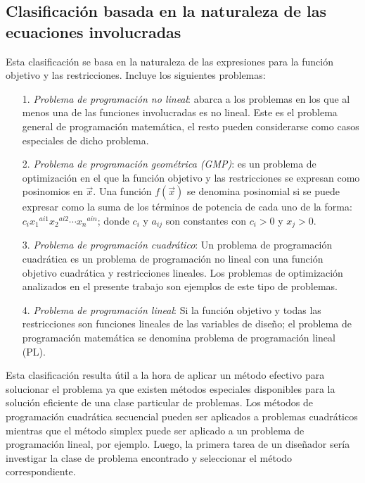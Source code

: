 \subsection{Clasificación basada en la naturaleza de las ecuaciones involucradas} 
Esta clasificación se basa en la naturaleza de las expresiones para la función objetivo y las restricciones.  Incluye los siguientes problemas: 
\begin{itemize}
\item [1.] \textit{Problema de programación no lineal}: abarca a los problemas en los que al menos una de las funciones involucradas es no lineal. Este es el problema general de programación matemática, el resto  pueden considerarse como casos especiales de dicho problema.
\item[2.]\textit{Problema de programación geométrica (GMP)}: es un problema de optimización en el que la función objetivo y las restricciones se expresan como posinomios en $\vec{x}$. Una función $f(\vec{x})$ se denomina posinomial si se puede expresar como la suma de los términos de potencia de cada uno de la forma: $c_i{x_1}^{ai1} {x_2}^{ai2} \cdots {x_n}^{ain}$; donde $c_i$ y $a_{ij}$ son constantes con $c_i> 0$ y $x_j> 0$.
\item[3.] \textit{Problema de programación cuadrático}: Un problema de programación cuadrática es un problema de programación no lineal con una función objetivo cuadrática y restricciones lineales. Los problemas de optimización analizados en el presente trabajo son ejemplos de este tipo de problemas. 
\item[4.] \textit{Problema de programación lineal}: Si la función objetivo y todas las restricciones son funciones lineales de las variables de diseño; el problema de programación matemática se denomina problema de programación lineal (PL).
\end{itemize}
Esta clasificación resulta útil a la hora de aplicar un método efectivo para solucionar el problema ya que existen  métodos especiales disponibles para la solución eficiente de una clase particular de problemas. Los métodos de programación cuadrática secuencial pueden ser aplicados a problemas cuadráticos mientras que el método simplex puede ser aplicado a un problema de programación lineal, por ejemplo. Luego, la primera tarea de un diseñador sería investigar la clase de problema encontrado y seleccionar el método correspondiente.

